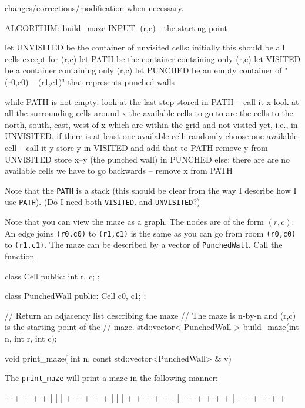 changes/corrections/modification when necessary.
\begin{console}
ALGORITHM: build_maze
INPUT: (r,c) - the starting point

let UNVISITED be the container of unvisited cells:
    initially this should be all cells except for (r,c)
let PATH be the container containing only (r,c)
let VISITED be a container containing only (r,c)
let PUNCHED be an empty container of "(r0,c0) -- (r1,c1)"
    that represents punched walls

while PATH is not empty:
    look at the last step stored in PATH -- call it x
    look at all the surrounding cells around x
    the available cells to go to are the
        cells to the north, south, east, west of x
        which are within the grid and not visited yet,
        i.e., in UNVISITED.
    if there is at least one available cell:
        randomly choose one available cell -- call it y
        store y in VISITED and add that to PATH
        remove y from UNVISITED
        store x--y (the punched wall) in PUNCHED
    else:
        there are are no available cells
        we have to go backwards -- remove x from PATH 
\end{console}
Note that the \texttt{PATH} is a stack
(this should be clear from the way I describe how I use
\texttt{PATH}).
(Do I need both  \texttt{VISITED}.
and \texttt{UNVISITED}?)

Note that you can view the maze as a graph.
The nodes are of the form $(r,c)$.
An edge joins \texttt{(r0,c0)} to
\texttt{(r1,c1)} is the same as you can go from
room \texttt{(r0,c0)} to \texttt{(r1,c1)}.
The maze can be described by a vector of \texttt{PunchedWall}. 
Call the function
\begin{console}
class Cell
{
public:
    int r, c;
};

class PunchedWall
{
public:
    Cell c0, c1;
};
  
// Return an adjacency list describing the maze
// The maze is n-by-n and (r,c) is the starting point of the
// maze.
std::vector< PunchedWall > build_maze(int n,
                                      int r, int c);

void print_maze( int n, const std::vector<PunchedWall> & v)
\end{console}
The \verb!print_maze! will print a maze in the following manner:
\begin{console}
+-+-+-+-+
|   |   |
+-+ +-+ +
| |     |
+ +-+-+ +
|     | |
+-+ +-+ +
|       |
+-+-+-+-+
\end{console}
